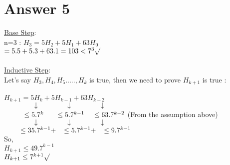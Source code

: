 \documentclass[12pt]{article}
\begin{document}
\section*{Answer 5}
\underline{Base Step}:\\
n=3 :  $H_{3} = 5H_{2} + 5H_{1} + 63H_{0}$\\
$= 5.5 + 5.3 + 63.1 = 103 < 7^{3}  \surd$  \\ \\
\underline{Inductive Step}:\\ 
Let's say $H_{3},H_{4},H_{5}.....,H_{k}$ is true, then we need to prove $H_{k+1}$ is true :\\ \\
$H_{k+1}=5H_{k}+5H_{k-1}+63H_{k-2}$\\
$\hspace*{1.5cm} \downarrow \hspace*{1.5cm} \downarrow \hspace*{1.5cm} \downarrow $\\
$\hspace*{1cm} \leq 5.7^k \hspace*{0.6cm} \leq 5.7^{k-1} \hspace*{0.4cm} \leq 63.7^{k-2} $  (From the assumption above) \\
$\hspace*{1.5cm} \downarrow \hspace*{1.5cm} \downarrow \hspace*{1.5cm} \downarrow $\\
$\hspace*{0.8cm} \leq 35.7^{k-1} +\hspace*{0.3cm} \leq 5.7^{k-1} +\hspace*{0.3cm} \leq 9.7^{k-1}  $\\
So,\\
$H_{k+1} \leq 49.7^{k-1}$\\
$H_{k+1} \leq 7^{k+1} \surd$
\end{document}
